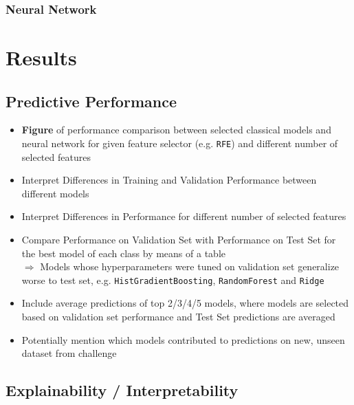 \documentclass[12pt, letterpaper]{article}
\begin{document}
\subsubsection{Neural Network} %



\section{Results} %


\subsection{Predictive Performance} %
\begin{itemize}
    \item \textbf{Figure} of performance comparison between selected classical models and neural network for given feature selector (e.g. \texttt{RFE}) and different number of selected features
    \item Interpret Differences in Training and Validation Performance between different models
    \item Interpret Differences in Performance for different number of selected features
    \item Compare Performance on Validation Set with Performance on Test Set for the best model of each class by means of a table \\
          $\Rightarrow$ Models whose hyperparameters were tuned on validation set generalize worse to test set, e.g. \texttt{HistGradientBoosting}, \texttt{RandomForest} and \texttt{Ridge}
    \item Include average predictions of top 2/3/4/5 models, where models are selected based on validation set performance and Test Set predictions are averaged
    \item Potentially mention which models contributed to predictions on new, unseen dataset from challenge
\end{itemize}


\subsection{Explainability / Interpretability} %
\end{document}
